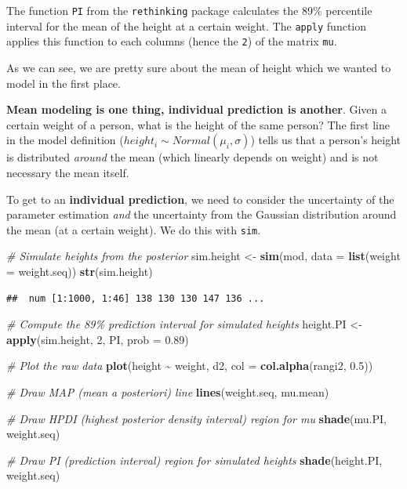 \documentclass[
]{book}
\newenvironment{Shaded}{\begin{snugshade}}{\end{snugshade}}
\newcommand{\AttributeTok}[1]{\textcolor[rgb]{0.13,0.29,0.53}{#1}}
\newcommand{\CommentTok}[1]{\textcolor[rgb]{0.56,0.35,0.01}{\textit{#1}}}
\newcommand{\DecValTok}[1]{\textcolor[rgb]{0.00,0.00,0.81}{#1}}
\newcommand{\FloatTok}[1]{\textcolor[rgb]{0.00,0.00,0.81}{#1}}
\newcommand{\FunctionTok}[1]{\textcolor[rgb]{0.13,0.29,0.53}{\textbf{#1}}}
\newcommand{\NormalTok}[1]{#1}
\newcommand{\OtherTok}[1]{\textcolor[rgb]{0.56,0.35,0.01}{#1}}
\newcommand{\SpecialCharTok}[1]{\textcolor[rgb]{0.81,0.36,0.00}{\textbf{#1}}}
\begin{document}
The function \texttt{PI} from the \texttt{rethinking} package calculates the 89\% percentile interval
for the mean of the height at a certain weight. The \texttt{apply} function
applies this function to each columns (hence the \texttt{2}) of the matrix \texttt{mu}.

As we can see, we are pretty sure about the mean of height which
we wanted to model in the first place.

\textbf{Mean modeling is one thing, individual prediction is another}.
Given a certain weight of a person, what is the height of the same person?
The first line in the model definition (\(height_i \sim Normal(\mu_i, \sigma)\))
tells us that a person's height is distributed \emph{around} the mean
(which linearly depends on weight) and is not necessary the mean itself.

To get to an \textbf{individual prediction}, we need to consider the uncertainty
of the parameter estimation \emph{and} the uncertainty from the Gaussian distribution
around the mean (at a certain weight). We do this with \texttt{sim}.

\begin{Shaded}
\begin{Highlighting}[]
\CommentTok{\# Simulate heights from the posterior}
\NormalTok{sim.height }\OtherTok{\textless{}{-}} \FunctionTok{sim}\NormalTok{(mod, }\AttributeTok{data =} \FunctionTok{list}\NormalTok{(}\AttributeTok{weight =}\NormalTok{ weight.seq))}
\FunctionTok{str}\NormalTok{(sim.height)}
\end{Highlighting}
\end{Shaded}

\begin{verbatim}
##  num [1:1000, 1:46] 138 130 130 147 136 ...
\end{verbatim}

\begin{Shaded}
\begin{Highlighting}[]
\CommentTok{\# Compute the 89\% prediction interval for simulated heights}
\NormalTok{height.PI }\OtherTok{\textless{}{-}} \FunctionTok{apply}\NormalTok{(sim.height, }\DecValTok{2}\NormalTok{, PI, }\AttributeTok{prob =} \FloatTok{0.89}\NormalTok{)}

\CommentTok{\# Plot the raw data}
\FunctionTok{plot}\NormalTok{(height }\SpecialCharTok{\textasciitilde{}}\NormalTok{ weight, d2, }\AttributeTok{col =} \FunctionTok{col.alpha}\NormalTok{(rangi2, }\FloatTok{0.5}\NormalTok{))}

\CommentTok{\# Draw MAP (mean a posteriori) line}
\FunctionTok{lines}\NormalTok{(weight.seq, mu.mean)}

\CommentTok{\# Draw HPDI (highest posterior density interval) region for mu}
\FunctionTok{shade}\NormalTok{(mu.PI, weight.seq)}

\CommentTok{\# Draw PI (prediction interval) region for simulated heights}
\FunctionTok{shade}\NormalTok{(height.PI, weight.seq)}
\end{Highlighting}
\end{Shaded}
\end{document}
